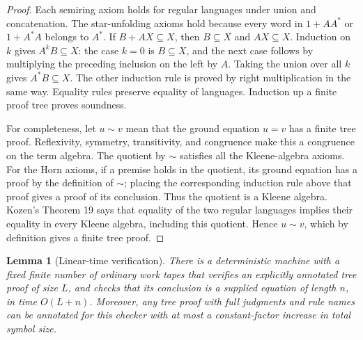 \documentclass[11pt]{article}
\newtheorem{lemma}[theorem]{Lemma}
\theoremstyle{definition}
\theoremstyle{remark}
\begin{document}
\begin{proof}
Each semiring axiom holds for regular languages under union and
concatenation. The star-unfolding axioms hold because every word in
$1+AA^*$ or $1+A^*A$ belongs to $A^*$. If $B+AX\subseteq X$,
then $B\subseteq X$ and $AX\subseteq X$. Induction on $k$ gives
$A^kB\subseteq X$: the case $k=0$ is $B\subseteq X$, and the
next case follows by multiplying the preceding inclusion on the
left by $A$. Taking the union over all $k$ gives
$A^*B\subseteq X$. The other induction rule is proved by right
multiplication in the same way. Equality rules preserve equality
of languages. Induction up a finite proof tree proves soundness.

For completeness, let $u\sim v$ mean that the ground equation
$u=v$ has a finite tree proof. Reflexivity, symmetry, transitivity,
and congruence make this a congruence on the term algebra. The
quotient by $\sim$ satisfies all the Kleene-algebra axioms. For
the Horn axioms, if a premise holds in the quotient, its ground
equation has a proof by the definition of $\sim$; placing the
corresponding induction rule above that proof gives a proof of its
conclusion. Thus the quotient is a Kleene algebra. Kozen's
Theorem 19 says that equality of the two regular languages implies
their equality in every Kleene algebra, including this quotient.
Hence $u\sim v$, which by definition gives a finite tree proof.
\end{proof}

\begin{lemma}[Linear-time verification]
\label{lem:tree-ka-linear-check}
There is a deterministic machine with a fixed finite number of
ordinary work tapes that verifies an explicitly annotated tree
proof of size $L$, and checks that its conclusion is a supplied
equation of length $n$, in time $O(L+n)$.
Moreover, any tree proof with full judgments and rule names can be
annotated for this checker with at most a constant-factor increase
in total symbol size.
\end{lemma}
\end{document}
